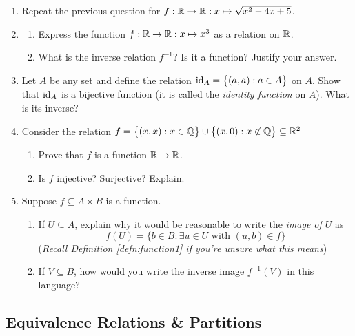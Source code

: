 \begin{exercises}{}{}
\begin{enumerate}
	  
	  \item Repeat the previous question for $f:\mathbb{R}\to\mathbb{R}:x\mapsto \sqrt{x^2-4x+5}$.
	  
	  
	  \item\begin{enumerate}
	    \item Express the function $f:\mathbb{R}\to\mathbb{R}:x\mapsto x^3$ as a relation on $\mathbb{R}$.
	    \item What is the inverse relation $f^{-1}$? Is it a function? Justify your answer.
	  \end{enumerate} 
	  
	  
	  \item	Let $A$ be any set and define the relation $\operatorname{id}_A=\bigl\{(a,a):a\in A\bigr\}$ on $A$. Show that $\operatorname{id}_A$ is a bijective function (it is called the \emph{identity function} on $A$). What is its inverse?
	
	  
	  \item Consider the relation $f=\bigl\{(x,x):x\in\mathbb{Q}\bigr\}\cup\bigl\{(x,0):x\not\in\mathbb{Q}\bigr\} \subseteq \mathbb{R}^2$
	  \begin{enumerate}
	    \item Prove that $f$ is a function $\mathbb{R}\to\mathbb{R}$.
	    \item Is $f$ injective? Surjective? Explain.
	  \end{enumerate}
	  
	    
	  \item Suppose $f\subseteq A\times B$ is a function.
	  \begin{enumerate}
	    \item If $U\subseteq A$, explain why it would be reasonable to write the \emph{image of $U$}  as
	    \[
	    	f(U)=\bigl\{ b\in B:\exists u\in U\text{ with }(u,b)\in f\bigr\}
	    \]
	    (\emph{Recall Definition \ref{defn:function1} if you're unsure what this means})
	    \item If $V\subseteq B$, how would you write the inverse image $f^{-1}(V)$ in this language?
	  \end{enumerate}
	\end{enumerate}

\end{exercises}

\clearpage


\subsection{Equivalence Relations \& Partitions}\label{sec:equiv}


